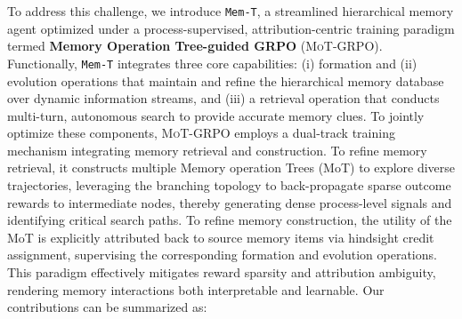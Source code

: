 \documentclass[11pt, a4paper]{lumia}
\newcommand{\ourmethod}{{\texttt{Mem-T}}\xspace} %
\newcommand{\ourtrain}{{\textsc{MoT-GRPO}}\xspace} %
\begin{document}
To address this challenge, we introduce \ourmethod, a streamlined hierarchical memory agent optimized under a process-supervised, attribution-centric training paradigm termed \textbf{Memory Operation Tree-guided GRPO} (\ourtrain). Functionally, \ourmethod integrates three core capabilities: (i) formation and (ii) evolution operations that maintain and refine the hierarchical memory database over dynamic information streams, and (iii) a retrieval operation that conducts multi-turn, autonomous search to provide accurate memory clues.
To jointly optimize these components, \ourtrain employs a dual-track training mechanism integrating memory retrieval and construction.
To refine memory retrieval, it constructs multiple Memory operation Trees (MoT) to explore diverse trajectories, leveraging the branching topology to back-propagate sparse outcome rewards to intermediate nodes, thereby generating dense process-level signals and identifying critical search paths. 
To refine memory construction, the utility of the MoT is explicitly attributed back to source memory items via hindsight credit assignment, supervising the corresponding formation and evolution operations. 
This paradigm effectively mitigates reward sparsity and attribution ambiguity, rendering memory interactions both interpretable and learnable.
Our contributions can be summarized as:
\end{document}
